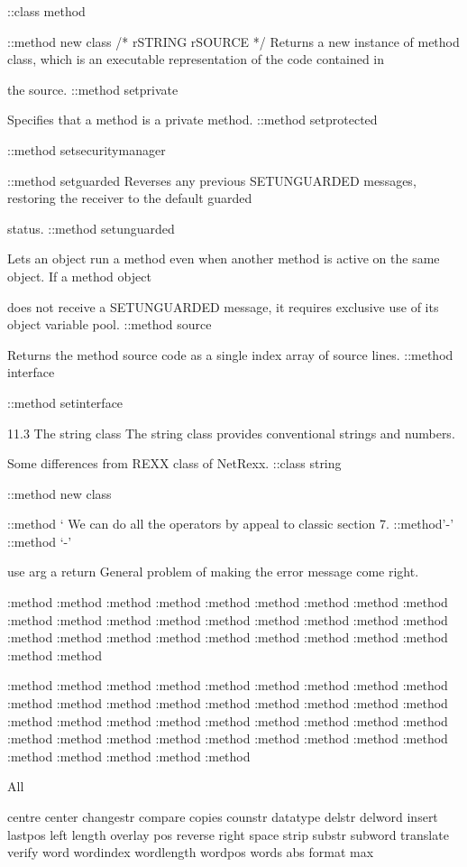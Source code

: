 ::class method

::method new class /* rSTRING rSOURCE */ Returns a new instance of
method class, which is an executable representation of the code
contained in

the source. ::method setprivate

Specifies that a method is a private method. ::method setprotected

::method setsecuritymanager

::method setguarded Reverses any previous SETUNGUARDED messages,
restoring the receiver to the default guarded

status. ::method setunguarded

Lets an object run a method even when another method is active on the
same object. If a method object

does not receive a SETUNGUARDED message, it requires exclusive use of
its object variable pool. ::method source

Returns the method source code as a single index array of source lines.
::method interface

::method setinterface

11.3 The string class The string class provides conventional strings and
numbers.

Some differences from REXX class of NetRexx. ::class string

::method new class

::method `\textquotesingle{} We can do all the operators by appeal to
classic section 7. ::method'-' ::method `-'

use arg a return \a General problem of making the error message come
right.

:method :method :method :method :method :method :method :method :method
:method :method :method :method :method :method :method :method :method
:method :method :method :method :method :method :method :method :method
:method :method

:method :method :method :method :method :method :method :method :method
:method :method :method :method :method :method :method :method :method
:method :method :method :method :method :method :method :method :method
:method :method :method :method :method :method :method :method :method
:method :method :method :method :method

All

centre center changestr compare copies counstr datatype delstr delword
insert lastpos left length overlay pos reverse right space strip substr
subword translate verify word wordindex wordlength wordpos words abs
format max


